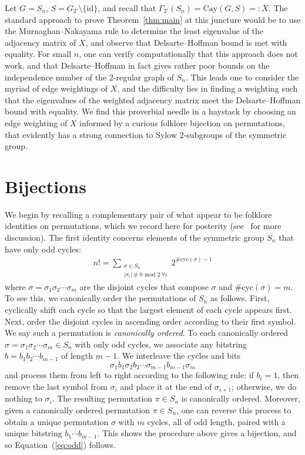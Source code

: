 \documentclass[12pt]{article}
\begin{document}
Let $G = S_n$, $S = G_{2'} \setminus \{\mathrm{id}\}$, and recall that $\Gamma_{2'}(S_n) = \mathrm{Cay}(G,S) =: X$. The standard approach to prove Theorem~\ref{thm:main} at this juncture would be to use the Murnaghan--Nakayama rule to determine the least eigenvalue of the adjacency matrix of $X$, and observe that Delsarte--Hoffman bound is met with equality. For small $n$, one can verify computationally that this approach does not work, and that Delsarte--Hoffman in fact gives rather poor bounds on the independence number of the 2-regular graph of $S_n$. This leads one to consider the myriad of edge weightings of $X$, and the difficulty lies in finding a weighting such that the eigenvalues of the weighted adjacency matrix meet the Delsarte--Hoffman bound with equality. We find this proverbial needle in a haystack by choosing an edge weighting of $X$ informed by a curious folklore bijection on permutations, that evidently has a strong connection to Sylow 2-subgroups of the symmetric group.


\section{Bijections}\label{sec:bijections}


We begin by recalling a complementary pair of what appear to be folklore identities on permutations, which we record here for posterity (see~\cite{Chen24, HopkinsMO, YuanMO} for more discussion). The first identity concerns elements of the symmetric group $S_n$ that have only odd cycles: 
\begin{align}\label{eq:odd}
	n! = \sum_{\substack{\sigma \in S_n \\ |\sigma_i| \not \equiv 0 \text{ mod } 2~\forall i}} \!\!\!\! 2^{\#\mathrm{cyc}(\sigma)-1}
\end{align}
where $\sigma = \sigma_1\sigma_2\cdots \sigma_m$ are the disjoint cycles that compose $\sigma$ and $\#\text{cyc}(\sigma)=m$. To see this, we canonically order the permutations of $S_n$ as follows. First, cyclically shift each cycle so that the largest element of each cycle appears first. Next, order the disjoint cycles in ascending order according to their first symbol. We say such a permutation is \emph{canonically ordered}. To each canonically ordered $\sigma = \sigma_1\sigma_2\cdots \sigma_m \in S_n$ with only odd cycles, we associate any bitstring $b = b_1b_2\cdots b_{m-1}$ of length $m-1$. We interleave the cycles and bits
\[
\sigma_1 b_1 \sigma_2 b_2 \cdots \sigma_{m-1} b_{m-1} \sigma_m
\]
and process them from left to right according to the following rule: if $b_i = 1$, then remove the last symbol from $\sigma_i$ and place it at the end of $\sigma_{i+1}$; otherwise, we do nothing to $\sigma_i$. The resulting permutation $\pi \in S_n$ is canonically ordered. Moreover, given a canonically ordered permutation $\pi \in S_n$, one can reverse this process to obtain a unique permutation $\sigma$ with $m$ cycles, all of odd length, paired with a unique bitstring $b_1 \cdots b_{m-1}$. This shows the procedure above gives a bijection, and so Equation~(\ref{eq:odd}) follows.
\end{document}
